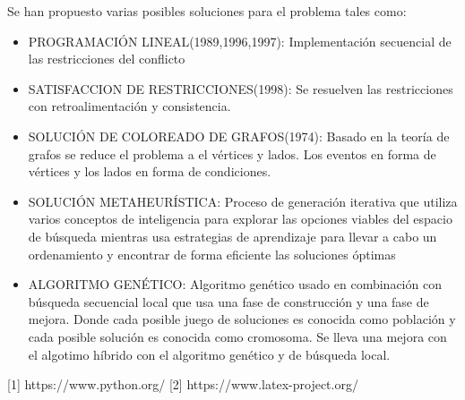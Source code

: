 	Se han propuesto varias posibles soluciones para el problema tales como:
	
	\begin{itemize}
		
		\item PROGRAMACIÓN LINEAL(1989,1996,1997): Implementación secuencial de las restricciones del conflicto
		
		\item SATISFACCION DE RESTRICCIONES(1998): Se resuelven las restricciones con retroalimentación y consistencia.
		
		\item SOLUCIÓN DE COLOREADO DE GRAFOS(1974): Basado en la teoría de grafos se reduce el problema a el vértices y lados. Los eventos en forma de vértices y los lados en forma de condiciones.
		
		\item SOLUCIÓN METAHEURÍSTICA: Proceso de generación iterativa que utiliza varios conceptos de inteligencia para explorar las opciones viables del espacio de búsqueda mientras usa estrategias de aprendizaje para llevar a cabo un ordenamiento y encontrar de forma eficiente las soluciones óptimas
		
		\item ALGORITMO GENÉTICO: Algoritmo genético usado en combinación con búsqueda secuencial local que usa una fase de construcción y una fase de mejora. Donde cada posible juego de soluciones es conocida como población y cada posible solución es conocida como cromosoma. Se lleva una mejora con el algotimo híbrido con el algoritmo genético y de búsqueda local.
	\end{itemize}


[1] https://www.python.org/
[2] https://www.latex-project.org/